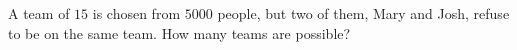 A team of $15$ is chosen from $5000$ people, but two of them, Mary and Josh, refuse to be on the same team. How many teams are possible?
